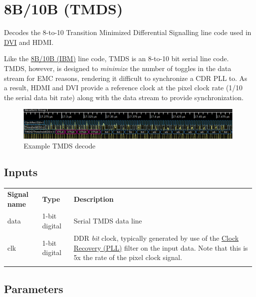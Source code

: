 \pagebreak
\section{8B/10B (TMDS)}
\label{filter:tmds}

Decodes the 8-to-10 Transition Minimized Differential Signalling line code used in \hyperref[filter:dvi]{DVI} and HDMI.

Like the \hyperref[filter:8b10b]{8B/10B (IBM)} line code, TMDS is an 8-to-10 bit serial line code. TMDS, however, is
designed to \emph{minimize} the number of toggles in the data stream for EMC reasons, rendering it difficult to
synchronize a CDR PLL to. As a result, HDMI and DVI provide a reference clock at the pixel clock rate (1/10 the serial
data bit rate) along with the data stream to provide synchronization.

\begin{figure}[h]
\centering
\includegraphics[width=16cm]{images/filters/tmds.png}
\caption{Example TMDS decode}
\label{filter_tmds}
\end{figure}

\subsection{Inputs}

\begin{tabularx}{16cm}{llX}
\thickhline
\textbf{Signal name} & \textbf{Type} & \textbf{Description} \\
\thickhline
data & 1-bit digital & Serial TMDS data line \\
\thickhline
clk & 1-bit digital & DDR \emph{bit} clock, typically generated by use of the \hyperref[filter:cdrpll]{Clock Recovery
(PLL)} filter on the input data. Note that this is 5x the rate of the pixel clock signal. \\
\thickhline
\end{tabularx}

\subsection{Parameters}

